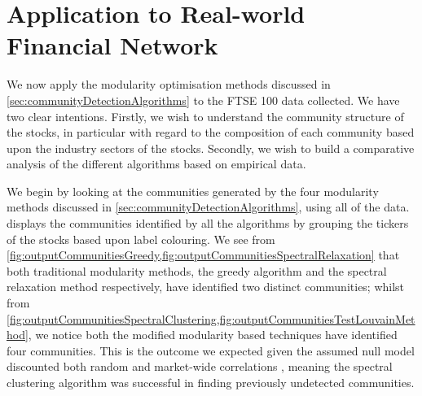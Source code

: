 
\section{Application to Real-world Financial Network}
\label{sec:applicationToRealWorldFinancialNetwork}

We now apply the modularity optimisation methods discussed in \cref{sec:communityDetectionAlgorithms} to the FTSE 100 data collected.
We have two clear intentions.
Firstly, we wish to understand the community structure of the stocks, in particular with regard to the composition of each community based upon the industry sectors of the stocks.
Secondly, we wish to build a comparative analysis of the different algorithms based on empirical data.

We begin by looking at the communities generated by the four modularity methods discussed in \cref{sec:communityDetectionAlgorithms}, using all of the data.
 displays the communities identified by all the algorithms by grouping the tickers of the stocks based upon label colouring.
We see from \cref{fig:outputCommunitiesGreedy,fig:outputCommunitiesSpectralRelaxation} that both traditional modularity methods, the greedy algorithm and the spectral relaxation method respectively, have identified two distinct communities; whilst from \cref{fig:outputCommunitiesSpectralClustering,fig:outputCommunitiesTestLouvainMethod}, we notice both the modified modularity based techniques have identified four communities.
This is the outcome we expected given the assumed null model discounted both random and market-wide correlations \cite{MG13}, meaning the spectral clustering algorithm was successful in finding previously undetected communities.

